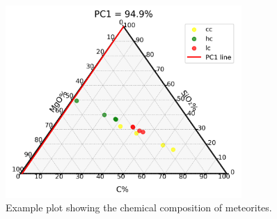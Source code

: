
\begin{figure}[H]
    \centering
    \includegraphics[width=0.8\textwidth]{figures/ternary_plot.png}
    \caption{Example plot showing the chemical composition of meteorites.}
    \label{fig:stacked}
\end{figure}